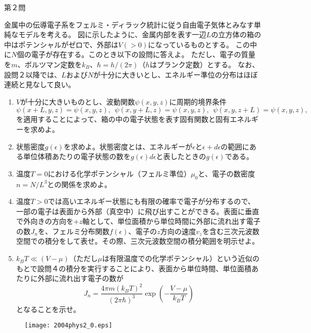 \documentclass[fleqn]{jbook}
\numberwithin{equation}{section}
\numberwithin{figure}{section}
\numberwithin{table}{section}
\begin{document}
\begin{question}{第２問}{}

金属中の伝導電子系をフェルミ・ディラック統計に従う自由電子気体とみなす単純なモデルを考える。
図に示したように、金属内部を表す一辺$L$の立方体の箱の中はポテンシャルがゼロで、外部は$V(>0)$になっているものとする。
この中に$N$個の電子が存在する。このとき以下の設問に答えよ。
ただし、電子の質量を$m$、ボルツマン定数を$k_B$、$\hbar=h/(2\pi)$（$h$はプランク定数）とする。
なお、設問２以降では、$L$および$N$が十分に大きいとし、エネルギー準位の分布はほぼ連続と見なして良い。

\begin{enumerate}
\item $V$が十分に大きいものとし、波動関数$\psi(x,y,z)$に周期的境界条件
  $$
  \psi(x+L,y,z)=\psi(x,y,z), ~~\psi(x,y+L,z)=\psi(x,y,z),~~\psi(x,y,z+L)=\psi(x,y,z),
  $$
  を適用することによって、箱の中の電子状態を表す固有関数と固有エネルギーを求めよ。
\item 状態密度$g(\epsilon)$を求めよ。状態密度とは、エネルギーが$\epsilon$と$\epsilon+d\epsilon$の範囲にある単位体積あたりの電子状態の数を$g(\epsilon)d\epsilon$と表したときの$g(\epsilon)$である。

\item 温度$T=0$における化学ポテンシャル（フェルミ準位）$\mu_0$と、電子の数密度$n=N/L^3$との関係を求めよ。

\item 温度$T>0$では高いエネルギー状態にも有限の確率で電子が分布するので、一部の電子は表面から外部（真空中）に飛び出すことができる。表面に垂直で外向きの方向を$+z$軸として、単位面積から単位時間に外部に流れ出す電子の数$J_n$を、フェルミ分布関数$f(\epsilon)$、電子の$z$方向の速度$v_z$を含む三次元波数空間での積分をして表せ。その際、三次元波数空間の積分範囲を明示せよ。

\item $k_B T \ll(V-\mu)$（ただし$\mu$は有限温度での化学ポテンシャル）という近似のもとで設問４の積分を実行することにより、表面から単位時間、単位面積あたりに外部に流れ出す電子の数が
  $$
  J_n=\frac{4\pi m(k_B T)^2}{(2\pi \hbar)^3}\exp\left(
  -\frac{V-\mu}{k_B T}
  \right)
  $$
  となることを示せ。
\end{enumerate}


\begin{figure}[htbp]
\begin{center}
\texttt{[image: 2004phys2\_0.eps]}
\caption{}
\end{center}
\end{figure}
\end{question}
\end{document}
